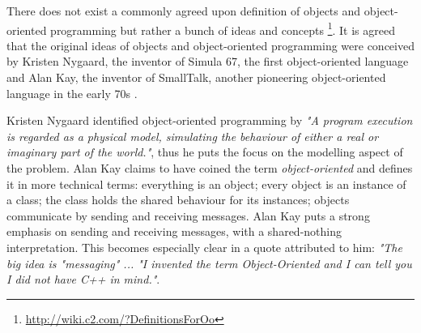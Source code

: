 \medskip

There does not exist a commonly agreed upon definition of objects and object-oriented programming but rather a bunch of ideas and concepts \footnote{\url{http://wiki.c2.com/?DefinitionsForOo}}. It is agreed that the original ideas of objects and object-oriented programming were conceived by Kristen Nygaard, the inventor of Simula 67, the first object-oriented language \cite{dahl_birth_2002} and Alan Kay, the inventor of SmallTalk, another pioneering object-oriented language in the early 70s \cite{kay_early_1993}. %

Kristen Nygaard identified object-oriented programming by \textit{"A program execution is regarded as a physical model, simulating the behaviour of either a real or imaginary part of the world."}, thus he puts the focus on the modelling aspect of the problem. Alan Kay claims to have coined the term \textit{object-oriented} and defines it in more technical terms: everything is an object; every object is an instance of a class; the class holds the shared behaviour for its instances; objects communicate by sending and receiving messages. Alan Kay puts a strong emphasis on sending and receiving messages, with a shared-nothing interpretation. This becomes especially clear in a quote attributed to him: \textit{"The big idea is "messaging" ... "I invented the term Object-Oriented and I can tell you I did not have C++ in mind."}.

\medskip


